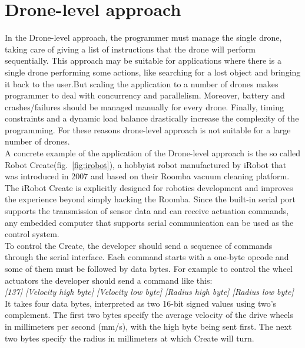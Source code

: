 \section {Drone-level approach}\label{droneLevel}

In the Drone-level approach, the programmer must manage the single drone, taking care of giving a list of instructions that the drone will perform sequentially.
This approach may be suitable for applications where there is a single drone performing some actions, like searching for a lost object and bringing it back to the user.But scaling the application to a number of drones makes programmer to deal with  concurrency and parallelism. Moreover, battery and crashes/failures should be managed manually for every drone. Finally, timing constraints and a dynamic load balance drastically increase the complexity of the programming. For these reasons drone-level approach is not suitable for a large number of drones.
\\

A concrete example of the application of the Drone-level approach is the so called Robot Create(fig.~\ref{fig:irobot}), a hobbyist robot manufactured by iRobot\cite{irobot} that was introduced in 2007 and based on their Roomba vacuum cleaning platform. The iRobot Create is explicitly designed for robotics development and improves the experience beyond simply hacking the Roomba. 
Since the built-in serial port supports the transmission of sensor data and can receive actuation commands, any embedded computer that supports serial communication can be used as the control system.
\\

To control the Create, the developer should send a sequence of commands through the serial interface. Each command starts with a one-byte opcode and some of them must be followed by data bytes. For example to control the wheel actuators the developer should send a command like this:
\\

\textit{[137] [Velocity high byte] [Velocity low byte] [Radius high byte] [Radius low byte]}
\\

It takes four data bytes, interpreted as two 16-bit signed values using two’s complement. The first two bytes specify the average velocity of the drive wheels in millimeters per second (mm/s), with the high byte being sent first. The next two bytes specify the radius in millimeters at which Create will turn.
\\

